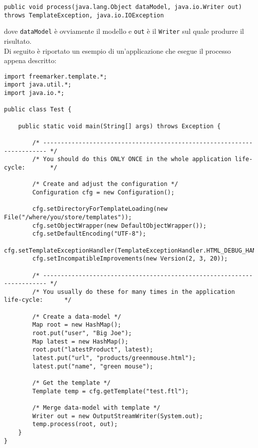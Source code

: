 \begin{lstlisting}
public void process(java.lang.Object dataModel, java.io.Writer out) throws TemplateException, java.io.IOException
\end{lstlisting}

dove \lstinline{dataModel} è ovviamente il modello e \lstinline{out} è il \lstinline{Writer} sul quale produrre il risultato.\\
Di seguito è riportato un esempio di un'applicazione che esegue il processo appena descritto:

\begin{lstlisting}
import freemarker.template.*;
import java.util.*;
import java.io.*;

public class Test {

    public static void main(String[] args) throws Exception {
        
        /* ----------------------------------------------------------------------- */    
        /* You should do this ONLY ONCE in the whole application life-cycle:       */    
    
        /* Create and adjust the configuration */
        Configuration cfg = new Configuration();

        cfg.setDirectoryForTemplateLoading(new File("/where/you/store/templates"));
        cfg.setObjectWrapper(new DefaultObjectWrapper());
        cfg.setDefaultEncoding("UTF-8");
        cfg.setTemplateExceptionHandler(TemplateExceptionHandler.HTML_DEBUG_HANDLER);
        cfg.setIncompatibleImprovements(new Version(2, 3, 20));

        /* ----------------------------------------------------------------------- */    
        /* You usually do these for many times in the application life-cycle:      */    

        /* Create a data-model */
        Map root = new HashMap();
        root.put("user", "Big Joe");
        Map latest = new HashMap();
        root.put("latestProduct", latest);
        latest.put("url", "products/greenmouse.html");
        latest.put("name", "green mouse");

        /* Get the template */
        Template temp = cfg.getTemplate("test.ftl");

        /* Merge data-model with template */
        Writer out = new OutputStreamWriter(System.out);
        temp.process(root, out);
    }
}
\end{lstlisting}

